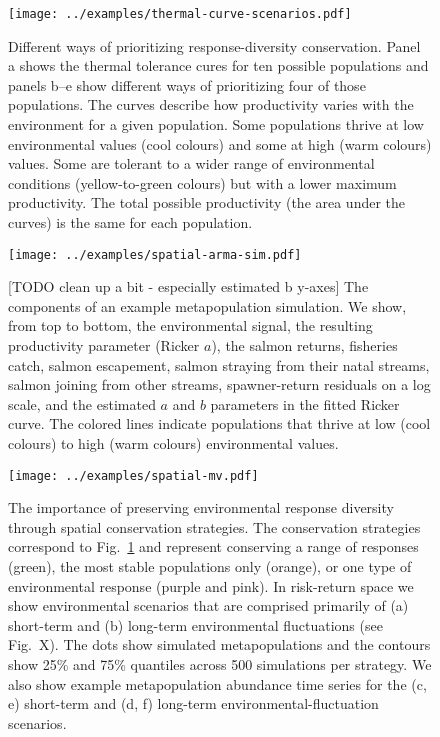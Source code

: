 \clearpage

\begin{figure}[htbp]
\centering
\texttt{[image: ../examples/thermal-curve-scenarios.pdf]}
\caption{Different ways of prioritizing response-diversity conservation. Panel a shows the thermal tolerance cures for ten possible populations and panels b--e show different ways of prioritizing four of those populations. The curves describe how productivity varies with the environment for a given population. Some populations thrive at low environmental values (cool colours) and some at high (warm colours) values. Some are tolerant to a wider range of environmental conditions (yellow-to-green colours) but with a lower maximum productivity. The total possible productivity (the area under the curves) is the same for each population.}
\label{f:curves}
\end{figure}

\clearpage

\begin{figure}[htbp]
\centering
\texttt{[image: ../examples/spatial-arma-sim.pdf]}
\caption{[TODO clean up a bit - especially estimated b y-axes] The components of an example metapopulation simulation.  We show, from top to bottom, the environmental signal, the resulting productivity parameter (Ricker $a$), the salmon returns, fisheries catch, salmon escapement, salmon straying from their natal streams, salmon joining from other streams, spawner-return residuals on a log scale, and the estimated $a$ and $b$ parameters in the fitted Ricker curve. The colored lines indicate populations that thrive at low (cool colours) to high (warm colours) environmental values.}
\label{f:sp-eg}
\end{figure}

\clearpage

\begin{figure}[htbp]
\centering
\texttt{[image: ../examples/spatial-mv.pdf]}
\caption{The importance of preserving environmental response diversity through spatial conservation strategies. The conservation strategies correspond to Fig.~\ref{f:curves} and represent conserving a range of responses (green), the most stable populations only (orange), or one type of environmental response (purple and pink).  In risk-return space we show environmental scenarios that are comprised primarily of (a) short-term and (b) long-term environmental fluctuations (see Fig.~X). The dots show simulated metapopulations and the contours show 25\% and 75\% quantiles across 500 simulations per strategy. We also show example metapopulation abundance time series for the (c, e) short-term and (d, f) long-term  environmental-fluctuation scenarios.}
\label{f:sp-mv}
\end{figure}

